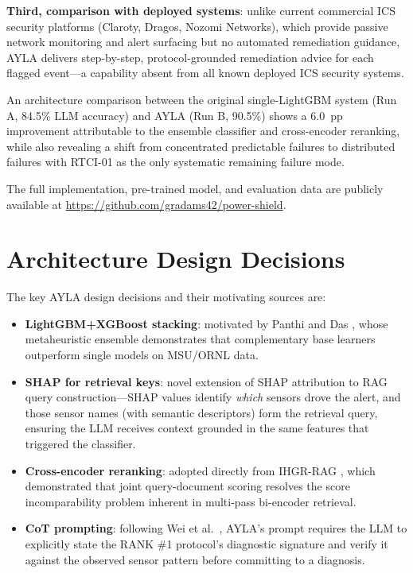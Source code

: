 \documentclass[twocolumn, 10pt, letterpaper]{article}
\begin{document}
\textbf{Third, comparison with deployed systems}: unlike current commercial ICS
security platforms (Claroty, Dragos, Nozomi Networks), which provide passive
network monitoring and alert surfacing but no automated remediation guidance,
AYLA delivers step-by-step, protocol-grounded remediation advice for each
flagged event---a capability absent from all known deployed ICS security systems.

An architecture comparison between the original single-LightGBM system (Run A,
84.5\% LLM accuracy) and AYLA (Run B, 90.5\%) shows a 6.0~pp improvement
attributable to the ensemble classifier and cross-encoder reranking, while also
revealing a shift from concentrated predictable failures to distributed failures
with RTCI-01 as the only systematic remaining failure mode.

The full implementation, pre-trained model, and evaluation data are publicly
available at \url{https://github.com/gradams42/power-shield}.




\appendix

\section{Architecture Design Decisions}
\label{app:design}

The key AYLA design decisions and their motivating sources are:

\begin{itemize}
    \item \textbf{LightGBM+XGBoost stacking}: motivated by Panthi and Das
          \cite{panthi2022ensemble}, whose metaheuristic ensemble demonstrates
          that complementary base learners outperform single models on MSU/ORNL data.
    \item \textbf{SHAP for retrieval keys}: novel extension of SHAP attribution to
          RAG query construction---SHAP values identify \textit{which} sensors drove
          the alert, and those sensor names (with semantic descriptors) form the
          retrieval query, ensuring the LLM receives context grounded in the
          same features that triggered the classifier.
    \item \textbf{Cross-encoder reranking}: adopted directly from
          IHGR-RAG \cite{ihgrrag2025}, which demonstrated that joint query-document
          scoring resolves the score incomparability problem inherent in
          multi-pass bi-encoder retrieval.
    \item \textbf{CoT prompting}: following Wei et al.\ \cite{wei2022cot},
          AYLA's prompt requires the LLM to explicitly state the RANK \#1
          protocol's diagnostic signature and verify it against the observed
          sensor pattern before committing to a diagnosis.
\end{itemize}
\end{document}
